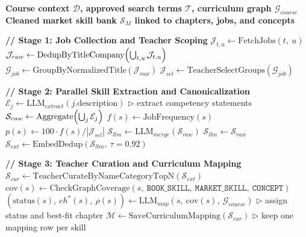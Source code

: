 \documentclass[varwidth=8.25in,border=8pt]{standalone}
\begin{document}
\setcounter{algorithm}{1}
\small
{}

\begin{algorithmic}[1]
\bfseries
\Require Course context $\mathcal{D}$, approved search terms $\mathcal{T}$, curriculum graph $\mathcal{G}_{course}$
\Ensure Cleaned market skill bank $\mathcal{S}_{M}$ linked to chapters, jobs, and concepts

\State \textbf{// Stage 1: Job Collection and Teacher Scoping}
    \State $\mathcal{J}_{t,u} \leftarrow \text{FetchJobs}(t,\ u)$
\EndFor
\State $\mathcal{J}_{raw} \leftarrow \text{DedupByTitleCompany}\Bigl(\bigcup_{t,u}\mathcal{J}_{t,u}\Bigr)$
\State $\mathcal{G}_{job} \leftarrow \text{GroupByNormalizedTitle}(\mathcal{J}_{raw})$
\State $\mathcal{J}_{sel} \leftarrow \text{TeacherSelectGroups}(\mathcal{G}_{job})$

\State
\State \textbf{// Stage 2: Parallel Skill Extraction and Canonicalization}
    \State $\mathcal{E}_j \leftarrow \text{LLM}_{extract}(j.\text{description})$
    \Statex \hspace{\algorithmicindent} $\triangleright$ extract competency statements
\EndFor
\State $\mathcal{S}_{raw} \leftarrow \text{Aggregate}\Bigl(\bigcup_j \mathcal{E}_j\Bigr)$
    \State $f(s) \leftarrow \text{JobFrequency}(s)$
    \State $p(s) \leftarrow 100 \cdot f(s) / |\mathcal{J}_{sel}|$
\EndFor
{}
    \State $\mathcal{S}_{llm} \leftarrow \text{LLM}_{merge}(\mathcal{S}_{raw})$
\Else
    \State $\mathcal{S}_{llm} \leftarrow \mathcal{S}_{raw}$
\EndIf
\State $\mathcal{S}_{ext} \leftarrow \text{EmbedDedup}(\mathcal{S}_{llm},\ \tau{=}0.92)$

\State
\State \textbf{// Stage 3: Teacher Curation and Curriculum Mapping}
\State $\mathcal{S}_{cur} \leftarrow \text{TeacherCurateByNameCategoryTopN}(\mathcal{S}_{ext})$
    \State $\text{cov}(s) \leftarrow \text{CheckGraphCoverage}(s,\ \texttt{BOOK\_SKILL},\ \texttt{MARKET\_SKILL},\ \texttt{CONCEPT})$
    \State $(\text{status}(s),\ ch^{*}(s),\ \rho(s)) \leftarrow \text{LLM}_{map}(s,\ \text{cov}(s),\ \mathcal{G}_{course})$
    \Statex \hspace{\algorithmicindent} $\triangleright$ assign status and best-fit chapter
\EndFor
\State $\mathcal{M} \leftarrow \text{SaveCurriculumMapping}(\mathcal{S}_{cur})$
\Statex \hspace{\algorithmicindent} $\triangleright$ keep one mapping row per skill


\end{algorithmic}
\end{document}
